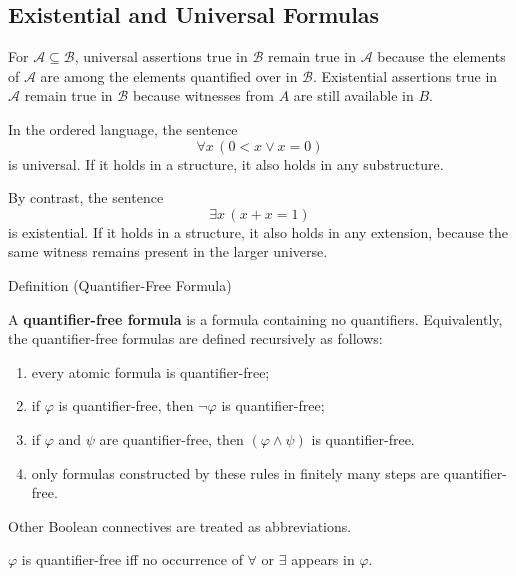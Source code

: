 \subsection{Existential and Universal Formulas}

\begin{remark*}
For $\mathcal{A}\subseteq\mathcal{B}$, universal assertions true in
$\mathcal{B}$ remain true in $\mathcal{A}$ because the elements of
$\mathcal{A}$ are among the elements quantified over in $\mathcal{B}$.
Existential assertions true in $\mathcal{A}$ remain true in $\mathcal{B}$
because witnesses from $A$ are still available in $B$.
\end{remark*}

\begin{example*}
In the ordered language, the sentence
\[
  \forall x\,(0<x\lor x=0)
\]
is universal. If it holds in a structure, it also holds in any substructure.

By contrast, the sentence
\[
  \exists x\,(x+x=1)
\]
is existential. If it holds in a structure, it also holds in any extension,
because the same witness remains present in the larger universe.
\end{example*}

\begin{definitionbox}{Definition (Quantifier-Free Formula)}
\begin{definition}\label{def:quantifier-free-formula}
A \textbf{quantifier-free formula} is a formula containing no quantifiers.
Equivalently, the quantifier-free formulas are defined recursively as follows:
\begin{enumerate}
  \item every atomic formula is quantifier-free;
  \item if $\varphi$ is quantifier-free, then $\lnot\varphi$ is
        quantifier-free;
  \item if $\varphi$ and $\psi$ are quantifier-free, then
        $(\varphi\land\psi)$ is quantifier-free.
  \item only formulas constructed by these rules in finitely many steps are
        quantifier-free.
\end{enumerate}
Other Boolean connectives are treated as abbreviations.
\end{definition}
\end{definitionbox}

\begin{remark*}
$\varphi$ is quantifier-free iff no occurrence of $\forall$ or $\exists$
appears in $\varphi$.
\end{remark*}

